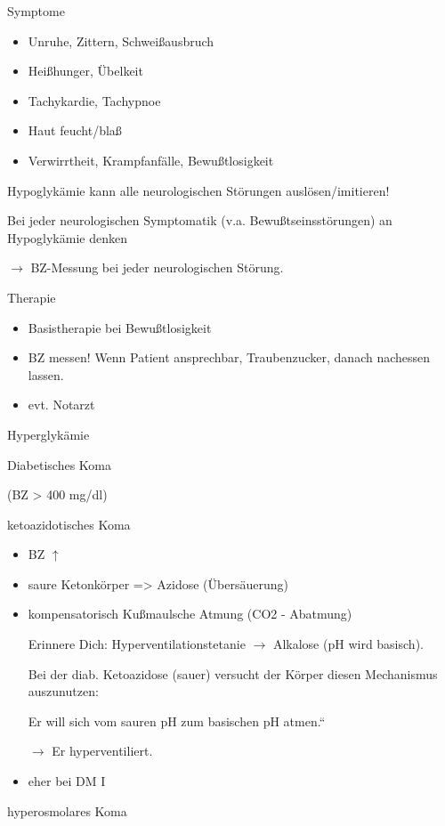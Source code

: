 \documentclass{article}
\begin{document}
Symptome

\begin{itemize}
\item Unruhe, Zittern, Schwei{\ss}ausbruch

\item Hei{\ss}hunger, \"Ubelkeit

\item Tachykardie, Tachypnoe

\item Haut feucht/bla{\ss}

\item Verwirrtheit, Krampfanf\"alle, Bewu{\ss}tlosigkeit

\end{itemize}
Hypoglyk\"amie kann alle neurologischen  St\"orungen
aus\-l\"osen/imitieren!

Bei jeder  neurologischen Symptomatik  (v.a. Bewu{\ss}tseinsst\"orungen)
an  Hypoglyk\"amie denken

${\rightarrow}$ BZ-Messung bei jeder neurologischen St\"orung. 

Therapie

\begin{itemize}
\item Basistherapie bei Bewu{\ss}tlosigkeit

\item BZ messen! Wenn Patient ansprechbar,  Traubenzucker, danach
nachessen lassen.

\item evt. Notarzt

\end{itemize}
Hyperglyk\"amie

Diabetisches Koma 

(BZ {\textgreater} 400 mg/dl)

ketoazidotisches Koma

\begin{itemize}
\item BZ ${\uparrow}$

\item saure Ketonk\"orper ={\textgreater} Azidose (\"Ubers\"auerung)

\item kompensatorisch Ku{\ss}maul{\textquotesingle}sche Atmung (CO2 -
Abatmung)

\begin{center}
\begin{minipage}{4.2cm}
Erinnere Dich: Hyperventilationstetanie ${\rightarrow}$ Alkalose (pH
wird basisch). 

Bei der diab. Ketoazidose (sauer) versucht der K\"orper diesen
Mechanismus auszunutzen: 

{\quotedblbase}Er will sich vom sauren pH zum basischen pH
atmen.{\textquotedblleft}

${\rightarrow}$ Er hyperventiliert.

\end{minipage}
\end{center}
\item eher bei DM I

\end{itemize}
hyperosmolares Koma
\end{document}
